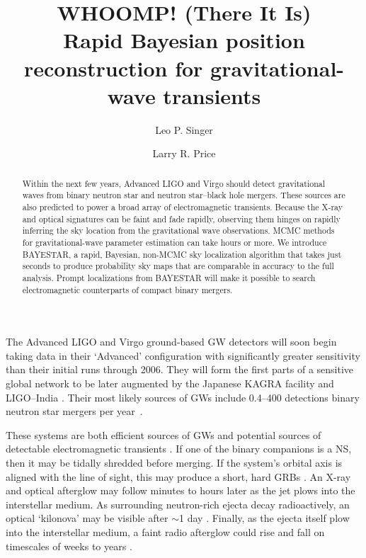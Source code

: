 \documentclass[amsmath,amssymb,aps,prx,reprint,nopreprintnumbers,nofootinbib]{revtex4-1}
\begin{document}
\title[Rapid-response Bayesian sky localization]{WHOOMP! (There It Is) \\
Rapid Bayesian position reconstruction for gravitational\nobreakdashes-wave transients}
\author{Leo P. Singer}
\author{Larry R. Price}

\begin{abstract}
Within the next few years, Advanced LIGO and Virgo should detect gravitational waves from binary neutron star and neutron star\nobreakdashes--black hole mergers. These sources are also predicted to power a broad array of electromagnetic transients. Because the X\nobreakdashes-ray and optical signatures can be faint and fade rapidly, observing them hinges on rapidly inferring the sky location from the gravitational wave observations. MCMC methods for gravitational\nobreakdashes-wave parameter estimation can take hours or more. We introduce BAYESTAR, a rapid, Bayesian, non-MCMC sky localization algorithm that takes just seconds to produce probability sky maps that are comparable in accuracy to the full analysis. Prompt localizations from BAYESTAR will make it possible to search electromagnetic counterparts of compact binary mergers.
\end{abstract}

\maketitle

The Advanced LIGO and Virgo ground-based \ac{GW} detectors will soon begin taking data \cite{LIGOObservingScenarios} in their `Advanced' configuration with significantly greater sensitivity than their initial runs through 2006. They will form the first parts of a sensitive global network to be later augmented by the Japanese KAGRA facility \cite{LCGT,KAGRAInterferometerDesign} and LIGO\nobreakdashes--India \cite{LIGOIndia}. Their most likely sources of \acp{GW} include 0.4\nobreakdashes--400 detections binary neutron star mergers per year~\cite{rates}.

These systems are both efficient sources of \acp{GW} and potential sources of detectable electromagnetic transients \citep{MostPromisingEMCounterpart}. If one of the binary companions is a \ac{NS}, then it may be tidally shredded before merging. If the system's orbital axis is aligned with the line of sight, this may produce a short, hard \acp{GRB}
\cite{1986ApJ...308L..43P,1989Natur.340..126E,1992ApJ...395L..83N,2011ApJ...732L...6R}. An X\nobreakdashes-ray and optical afterglow may follow minutes to hours later as the jet plows into the interstellar medium. As surrounding neutron-rich ejecta decay radioactively, an optical `kilonova' may be visible after $\sim$1 day \cite{metzger:2010}. Finally, as the ejecta itself plow into the interstellar medium, a faint radio afterglow could rise and fall on timescales of weeks to years \cite{Nakar:2011cw}.
\end{document}
